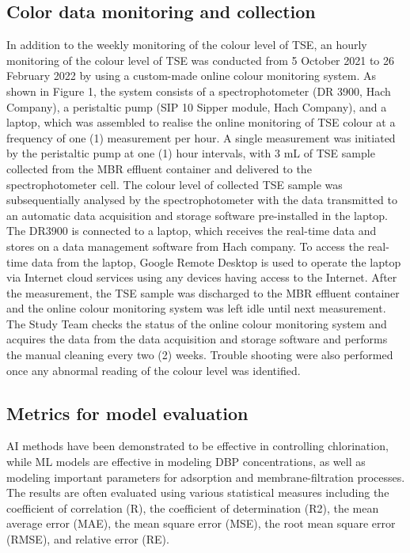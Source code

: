 \subsection{Color data monitoring and collection}
In addition to the weekly monitoring of the colour level of TSE, an hourly monitoring of the colour level of TSE was conducted from 5 October 2021 to 26 February 2022 by using a custom-made online colour monitoring system. As shown in Figure 1, the system consists of a spectrophotometer (DR 3900, Hach Company), a peristaltic pump (SIP 10 Sipper module, Hach Company), and a laptop, which was assembled to realise the online monitoring of TSE colour at a frequency of one (1) measurement per hour. A single measurement was initiated by the peristaltic pump at one (1) hour intervals, with 3 mL of TSE sample collected from the MBR effluent container and delivered to the spectrophotometer cell. The colour level of collected TSE sample was subsequentially analysed by the spectrophotometer with the data transmitted to an automatic data acquisition and storage software pre-installed in the laptop. The DR3900 is connected to a laptop, which receives the real-time data and stores on a data management software from Hach company. To access the real-time data from the laptop, Google Remote Desktop is used to operate the laptop via Internet cloud services using any devices having access to the Internet. After the measurement, the TSE sample was discharged to the MBR effluent container and the online colour monitoring system was left idle until next measurement. The Study Team checks the status of the online colour monitoring system and acquires the data from the data acquisition and storage software and performs the manual cleaning every two (2) weeks. Trouble shooting were also performed once any abnormal reading of the colour level was identified. 

\subsection{Metrics for model evaluation}
AI methods have been demonstrated to be effective in controlling chlorination, while ML models are effective in modeling DBP concentrations, as well as modeling important parameters for adsorption and membrane-filtration processes. The results are often evaluated using various statistical measures including the coefficient of correlation (R), the coefficient of determination (R2), the mean average error (MAE), the mean square error (MSE), the root mean square error (RMSE), and relative error (RE).

